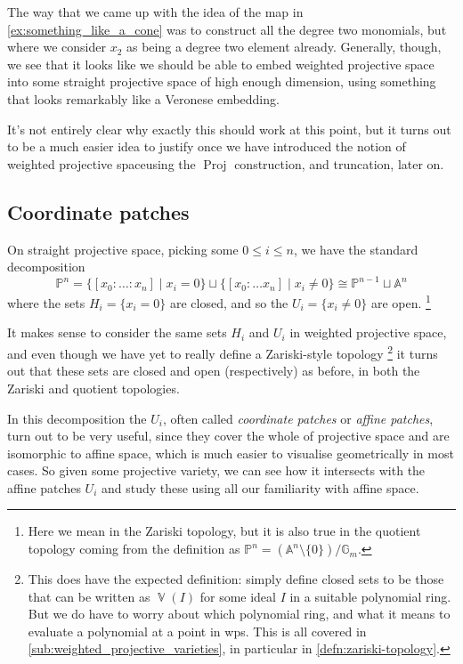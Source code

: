 \documentclass[10pt,notitlepage]{article}
\numberwithin{equation}{subsection}
\DeclareMathOperator{\proj}{Proj}
\DeclareMathOperator{\van}{\mathbb{V}}
\newcommand{\aff}{\mathbb{A}}
\newcommand{\pee}{\mathbb{P}}
\newcommand{\gm}{\mathbb{G}_m}
\begin{document}
    The way that we came up with the idea of the map in \cref{ex:something_like_a_cone} was to construct all the degree two monomials, but where we consider $x_2$ as being a degree two element already.
    Generally, though, we see that it looks like we should be able to embed weighted projective space into some straight projective space of high enough dimension, using something that looks remarkably like a Veronese embedding.

    It's not entirely clear why exactly this should work at this point, but it turns out to be a much easier idea to justify once we have introduced the notion of weighted projective spaceusing the $\proj$ construction, and truncation, later on.





    \subsection{Coordinate patches} %
    \label{sub:coordinate_patches}

    On straight projective space, picking some $0\leqslant i\leqslant n$, we have the standard decomposition
    \[
        \pee^n = \{[x_0:\ldots:x_n]\mid x_i=0\}\sqcup\{[x_0:\ldots x_n]\mid x_i\neq0\} \cong \pee^{n-1}\sqcup\aff^n
    \]
    where the sets $H_i=\{x_i=0\}$ are closed, and so the $U_i=\{x_i\neq0\}$ are open.%
    \footnote{%
        Here we mean in the Zariski topology, but it is also true in the quotient topology coming from the definition as \mbox{$\pee^n=(\aff^n\setminus\{0\})/\gm$}.%
    }

    It makes sense to consider the same sets $H_i$ and $U_i$ in weighted projective space, and even though we have yet to really define a Zariski-style topology%
    \footnote{%
        This does have the expected definition: simply define closed sets to be those that can be written as $\van(I)$ for some ideal $I$ in a suitable polynomial ring.
        But we do have to worry about which polynomial ring, and what it means to evaluate a polynomial at a point in wps.
        This is all covered in \cref{sub:weighted_projective_varieties}, in particular in \cref{defn:zariski-topology}.%
    } it turns out that these sets are closed and open (respectively) as before, in both the Zariski and quotient topologies.

    In this decomposition the $U_i$, often called \emph{coordinate patches} or \emph{affine patches}, turn out to be very useful, since they cover the whole of projective space and are isomorphic to affine space, which is much easier to visualise geometrically in most cases.
    So given some projective variety, we can see how it intersects with the affine patches $U_i$ and study these using all our familiarity with affine space.
\end{document}
